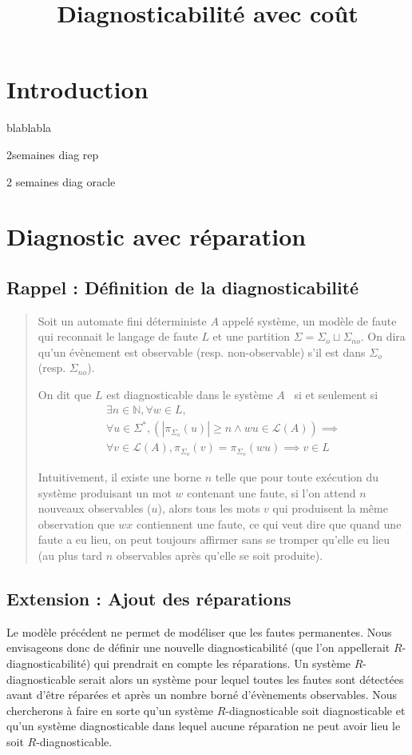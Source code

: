 \documentclass[a4paper,10pt]{article}
\title{Diagnosticabilit\'e avec co\^ut}
\begin{document}
\section*{Introduction}

blablabla

2semaines diag rep

2 semaines diag oracle

\section{Diagnostic avec r\'eparation}
\subsection{Rappel : Définition de la diagnosticabilité}
\begin{quote}
Soit un automate fini d\'eterministe $A$ appel\'e syst\`eme, un modèle de faute qui reconnait le langage de faute $L$ et une partition $\Sigma=\Sigma_o\sqcup \Sigma_{no}$. On dira qu'un \'ev\`enement est observable (resp. non-observable) s'il est dans $\Sigma_o$ (resp. $\Sigma_{no}$).

On dit que $L$ est diagnosticable dans le système $A$~\cite{SamSRST96}  si et seulement si $$\begin{array}{l}
\exists n \in \mathbb N, \forall w \in L,\\
\forall u \in \Sigma^*, \left(\left|\pi_{\Sigma_o}(u)\right|\ge n \land wu \in \mathcal L(A)\right) \implies\\
\forall v \in \mathcal L(A), \pi_{\Sigma_o}(v)=\pi_{\Sigma_o}(wu) \implies v \in L
\end{array}$$

Intuitivement, il existe une borne $n$ telle que pour toute ex\'ecution du système produisant un mot $w$ contenant une faute, si l'on attend $n$ nouveaux observables ($u$), alors tous les mots $v$ qui produisent la m\^eme observation que $wx$ contiennent une faute, ce qui veut dire que quand une faute a eu lieu, on peut toujours affirmer sans se tromper qu'elle eu lieu (au plus tard $n$ observables après qu'elle se soit produite).
\end{quote}

\subsection{Extension : Ajout des r\'eparations}

Le mod\`ele pr\'ec\'edent ne permet de mod\'eliser que les fautes permanentes. Nous envisageons donc de d\'efinir une nouvelle diagnosticabilit\'e (que l'on appellerait $R$-diagnosticabilit\'e) qui prendrait en compte les r\'eparations. Un syst\`eme $R$-diagnosticable serait alors un syst\`eme pour lequel toutes les fautes sont d\'etect\'ees avant d'\^etre r\'epar\'ees et apr\`es un nombre born\'e d'\'ev\`enements observables. Nous chercherons \`a faire en sorte qu'un syst\`eme $R$-diagnosticable soit diagnosticable et qu'un syst\`eme diagnosticable dans lequel aucune r\'eparation ne peut avoir lieu le soit $R$-diagnosticable.
\end{document}
